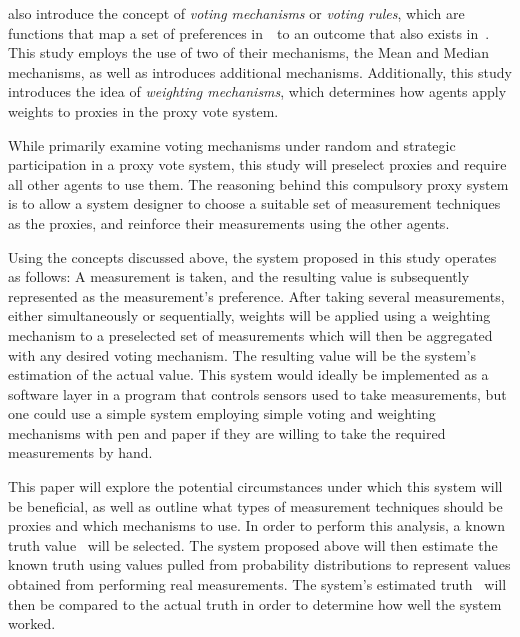  also introduce the concept of \textit{voting mechanisms} or
\textit{voting rules}, which are functions that map a set of preferences
in~\systemspace\ to an outcome that also exists in~\systemspace.
%
%
This study employs the use of two of their mechanisms, the Mean and Median
mechanisms, as well as introduces additional mechanisms.
Additionally, this study introduces the idea of \textit{weighting mechanisms}, which
determines how agents apply weights to proxies in the proxy vote system.
%

While  primarily examine voting mechanisms under random and strategic
participation in a proxy vote system, this study will preselect proxies and require
all other agents to use them.
The reasoning behind this compulsory proxy system is to allow a system designer to
choose a suitable set of measurement techniques as the proxies, and reinforce their
measurements using the other agents.
%

Using the concepts discussed above, the system proposed in this study
operates as follows:
A measurement is taken, and the resulting value is subsequently represented as the
measurement's preference.
After taking several measurements, either simultaneously or sequentially, weights will
be applied using a weighting mechanism to a preselected set of measurements which
will then be aggregated with any desired voting mechanism.
The resulting value will be the system's estimation of the actual value.
This system would ideally be implemented as a software layer in a program that
controls sensors used to take measurements, but one could use a simple system employing
simple voting and weighting mechanisms with pen and paper if they are willing to take
the required measurements by hand.


This paper will explore the potential circumstances under which this system will be
beneficial, as well as outline what types of measurement techniques should be proxies
and which mechanisms to use.
In order to perform this analysis, a known truth value \truth\ will be selected.  
The system proposed above will then estimate the known truth using
values pulled from probability distributions to represent values obtained from
performing real measurements.
The system's estimated truth \systemtruth\ will then be compared to the actual truth
in order to determine how well the system worked.

